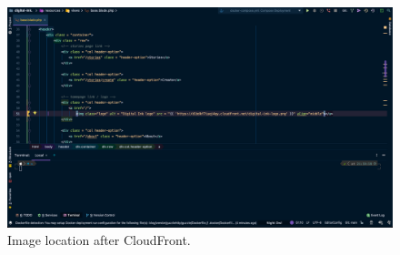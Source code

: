 \begin{figure}[!htbp]
    \centering
    \includegraphics[width=\textwidth]{resources/cloudfront/cloudfront-after}
    \caption{Image location after CloudFront.}
    \label{fig:cloudfront-after}
\end{figure}





